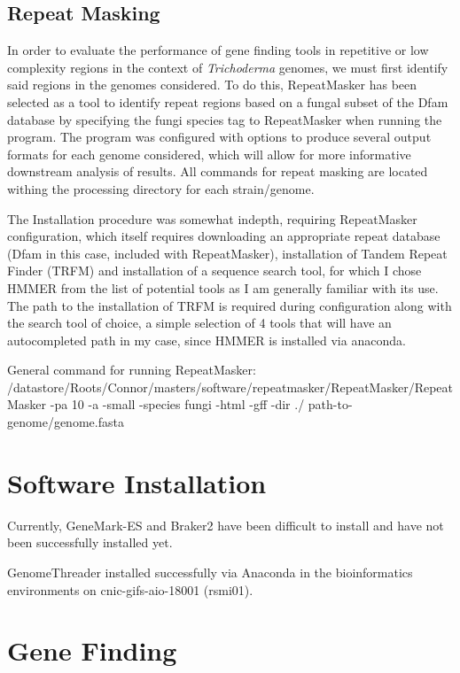 \documentclass[12pt]{article}
\begin{document}
\subsection{Repeat Masking}

In order to evaluate the performance of gene finding tools in
repetitive or low complexity regions in the context of
\textit{Trichoderma} genomes, we must first identify said regions in
the genomes considered. To do this, RepeatMasker has been selected as
a tool to identify repeat regions based on a fungal subset of the Dfam
database by specifying the fungi species tag to RepeatMasker when
running the program. The program was configured with options to
produce several output formats for each genome considered, which will
allow for more informative downstream analysis of results. All
commands for repeat masking are located withing the processing
directory for each strain/genome.

The Installation procedure was somewhat indepth, requiring
RepeatMasker configuration, which itself requires downloading an
appropriate repeat database (Dfam in this case, included with
RepeatMasker), installation of Tandem Repeat Finder (TRFM) and
installation of a sequence search tool, for which I chose HMMER from
the list of potential tools as I am generally familiar with its
use. The path to the installation of TRFM is required during
configuration along with the search tool of choice, a simple selection
of 4 tools that will have an autocompleted path in my case, since
HMMER is installed via anaconda.

General command for running RepeatMasker:
/datastore/Roots/Connor/masters/software/repeatmasker/RepeatMasker/RepeatMasker
-pa 10 -a -small -species fungi -html -gff -dir ./
path-to-genome/genome.fasta


\section{Software Installation}

Currently, GeneMark-ES and Braker2 have been difficult to install and
have not been successfully installed yet.

GenomeThreader installed successfully via Anaconda in the
bioinformatics environments on cnic-gifs-aio-18001 (rsmi01).

\section{Gene Finding}
\end{document}
